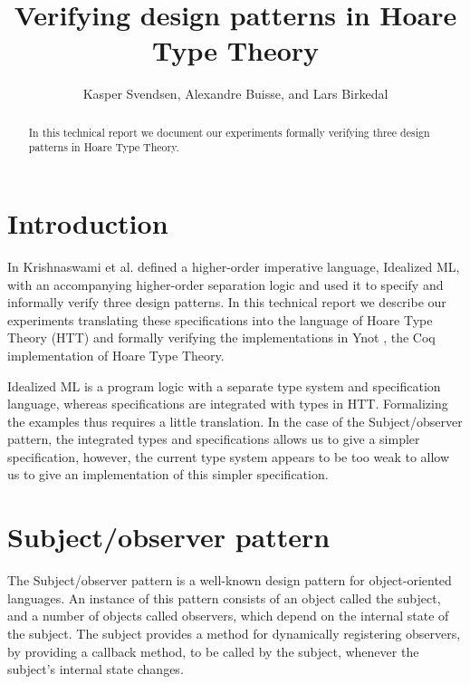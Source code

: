 \documentclass[a4paper,english]{article}
\title{Verifying design patterns in Hoare Type Theory}
\author{Kasper Svendsen, Alexandre Buisse, and Lars Birkedal}
\begin{document}
 
\maketitle

\begin{abstract}
In this technical report we document our experiments formally verifying three
design patterns in Hoare Type Theory.
\end{abstract}

\section{Introduction}

In \cite{patterns, subobj} Krishnaswami et al. defined a higher-order imperative
language, Idealized ML, with an accompanying higher-order separation logic and
used it to specify and informally verify three design patterns. In this
technical report we describe our experiments translating these specifications
into the language of Hoare Type Theory (HTT) and formally verifying the
implementations in Ynot \cite{ynot-conf}, the Coq implementation of Hoare
Type Theory.

Idealized ML is a program logic with a separate type system and specification
language, whereas specifications are integrated with types in HTT. Formalizing
the examples thus requires a little translation. In the case of the
Subject/observer pattern, the integrated types and specifications allows us to
give a simpler specification, however, the current type system appears to be
too weak to allow us to give an implementation of this simpler specification. 

\section{Subject/observer pattern}

The Subject/observer pattern is a well-known design pattern for object-oriented
languages. An instance of this pattern consists of an object called the
subject, and a number of objects called observers, which depend on the internal
state of the subject. The subject provides a method for dynamically registering
observers, by providing a callback method, to be called by the subject,
whenever the subject's internal state changes.
\end{document}
